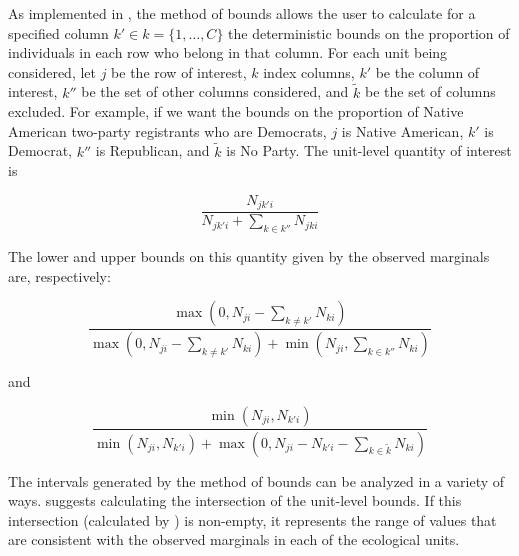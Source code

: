 As implemented in , the method of bounds allows the user
to calculate for a specified column $k' \in k = \{1, \dots, C\}$ the deterministic bounds on the proportion of
individuals in each row who belong in that column.  For each
unit being considered, let $j$ be the row of interest, $k$ index
columns, $k'$ be the column of interest, $k''$ be the set of other
columns considered, and $\tilde{k}$ be the set of columns excluded.
For example, if we want the bounds on the proportion of Native
American two-party registrants who are Democrats, $j$ is Native
American, $k'$ is Democrat, $k''$ is Republican, and $\tilde{k}$ is No
Party.  The unit-level quantity of interest is

\begin{displaymath}
\frac{N_{jk'i}}{N_{jk'i} + \sum_{k \in k''} N_{jki}}
\end{displaymath}

\noindent The lower and upper bounds on this quantity given by the
observed marginals are, respectively:

\begin{displaymath}
\frac{\max(0, N_{ji} - \sum_{k \neq k'} N_{ki})}{\max(0, N_{ji} - \sum_{k \neq
k'} N_{ki}) + \min(N_{ji}, \sum_{k \in k''} N_{ki})}
\end{displaymath}

\noindent and

\begin{displaymath}
\frac{\min(N_{ji}, N_{k'i})}{\min(N_{ji}, N_{k'i}) + \max(0, N_{ji} - N_{k'i} - \sum_{k \in \tilde{k}} N_{ki})}
\end{displaymath}

The intervals generated by the method of bounds can be analyzed in a
variety of ways.  \citet{Grofman00} suggests calculating the
intersection of the unit-level bounds.  If this intersection (calculated by ) is non-empty, it represents the range of values
that are consistent with the observed marginals in each of the
ecological units.  

